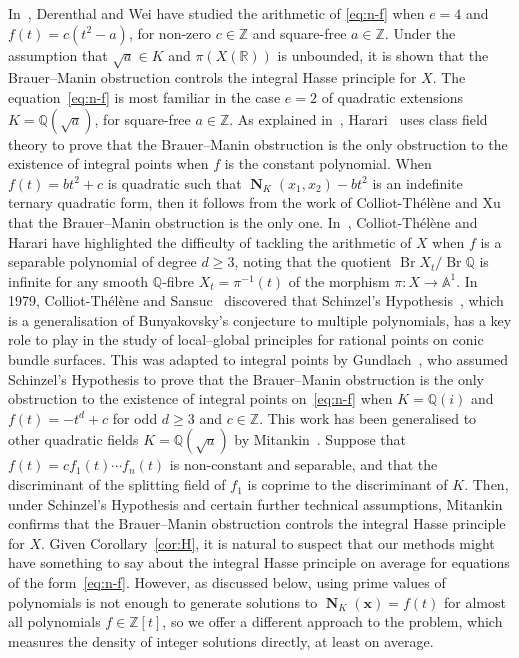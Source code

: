 \documentclass[11pt,letterpaper]{amsart}
\renewcommand{\geq}{\geqslant}
\theoremstyle{definition}
\numberwithin{equation}{section}
\renewcommand\AA{\mathbb{A}}
\newcommand\RR{\mathbb{R}}
\newcommand\ZZ{\mathbb{Z}}
\newcommand\QQ{\mathbb{Q}}
\DeclareMathOperator{\Br}{Br}
\DeclareMathOperator{\nf}{\mathbf{N}}
\newcommand{\0}{\mathbf{0}}
\begin{document}
In~\cite[Thm.~1.1]{DW},
Derenthal and Wei have studied the arithmetic of
\eqref{eq:n-f} when $e=4$ and $f(t)=c(t^2-a)$, for non-zero $c\in \ZZ$ and square-free $a\in \ZZ$. 
Under the assumption that $\sqrt{a}\in K$ and $\pi(X(\RR))$ is unbounded, it is shown that the Brauer--Manin obstruction controls the integral Hasse principle for $X$.
The equation~\eqref{eq:n-f} is most familiar in the case $e=2$ of quadratic extensions $K=\QQ(\sqrt{a})$, for square-free $a\in \ZZ$.
As explained in~\cite[\S 4]{harari}, 
  Harari~\cite[Thm.~4]{harari} uses class field theory to prove that the Brauer--Manin obstruction 
is the only obstruction to the existence of integral points
when $f$ is  the constant polynomial.
When $f(t)=bt^2+c$ is quadratic such that  $\nf_{K}(x_1,x_2)-bt^2$ is an indefinite ternary quadratic form, then it follows from 
the work of Colliot-Th\'el\`ene and Xu~\cite[Thm.~6.3]{xu} that the Brauer--Manin obstruction  is the only one. 
In~\cite[p.~175]{CTH}, Colliot-Th\'el\`ene and Harari have highlighted the difficulty of tackling the arithmetic of $X$ when $f$ is a separable polynomial of degree $d\geq 3$, noting that the quotient $\Br X_t/\Br \QQ$ is infinite for any smooth $\QQ$-fibre $X_t=\pi^{-1}(t)$ of the morphism $\pi:X\to \AA^1$.
In 1979, Colliot-Th\'el\`ene and Sansuc~\cite{sansuc} discovered 
that  Schinzel's Hypothesis~\cite{schinzel}, 
which is a generalisation of Bunyakovsky's conjecture to multiple polynomials, 
has a  key role to play in the study of local--global principles for rational points on 
conic bundle surfaces.
This was adapted to integral points by 
Gundlach~\cite[Thm.~2]{gundlach}, who assumed 
Schinzel's Hypothesis 
to prove that the 
Brauer--Manin obstruction is the only obstruction to the existence of integral points
on~\eqref{eq:n-f} when $K=\QQ(i)$ and  
$f(t)=-t^d+c$ for odd $d\geq 3$ and $c\in \ZZ$.
This work has been generalised to other quadratic fields 
$K=\QQ(\sqrt{a})$ by Mitankin~\cite{vlad}.  
Suppose that $f(t)=cf_1(t)\cdots f_n(t)$ is non-constant and separable, and that the discriminant of the splitting field of $f_1$ is coprime to the discriminant of $K$. Then, under 
Schinzel's Hypothesis  and 
certain further technical assumptions,   Mitankin  confirms 
that the Brauer--Manin obstruction controls the integral Hasse principle for $X$.
Given  Corollary~\ref{cor:H}, it is natural to suspect that our methods might have something to say about the integral Hasse principle on average
for equations of the form~\eqref{eq:n-f}. However, as discussed below, using prime values of polynomials is not enough to generate solutions to $\nf_K(\mathbf{x})=f(t)$ for almost all 
polynomials $f\in \mathbb{Z}[t]$, so we offer a different approach to the problem,  which measures  the density of integer solutions directly, at least on average.
\end{document}
